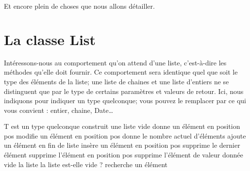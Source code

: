	Et encore plein de choses que nous allons détailler.
	
	\section{La classe List}
	
		Intéressons-nous au comportement qu’on attend d'une liste,
		c'est-à-dire les méthodes qu’elle doit fournir.
		Ce comportement sera identique quel que soit le type des éléments
		de la liste; une liste de chaines et une liste d'entiers
		ne se distinguent que par le type de certains paramètres
		et valeurs de retour.
		Ici, nous indiquons  pour indiquer un type quelconque;
		vous pouvez le remplacer par ce qui vous convient : 
		entier, chaine, Date\dots
		
		\begin{LDA}
				\RComment T est un type quelconque
				\Public
						\RComment construit une liste vide
						\RComment donne un élément en position pos
						\RComment modifie un élément en position pos
						\RComment donne le nombre actuel d’éléments
						\RComment ajoute un élément en fin de liste
						\RComment insère un élément en position pos
						\RComment supprime le dernier élément
						\RComment supprime l'élément en position pos
						\RComment supprime l'élément de valeur donnée
						\RComment vide la liste
						\RComment la liste est-elle vide ?
						\RComment recherche un élément
				\EndClass
		\end{LDA}
		
		\bigskip
		

